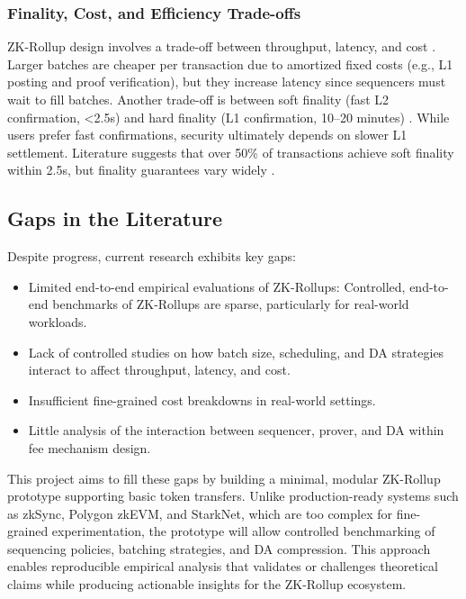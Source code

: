 \subsubsection{Finality, Cost, and Efficiency Trade-offs}
\vspace{12pt}
ZK-Rollup design involves a trade-off between throughput, latency, and cost \cite{motepalli2023sok}. Larger batches are cheaper per transaction due to amortized fixed costs (e.g., L1 posting and proof verification), but they increase latency since sequencers must wait to fill batches. Another trade-off is between soft finality (fast L2 confirmation, \textless 2.5s) and hard finality (L1 confirmation, 10–20 minutes) \cite{gogol2025scalingdefi}. While users prefer fast confirmations, security ultimately depends on slower L1 settlement. Literature suggests that over 50\% of transactions achieve soft finality within 2.5s, but finality guarantees vary widely \cite{gogol2025scalingdefi}.

\subsection{Gaps in the Literature}
\vspace{12pt}

Despite progress, current research exhibits key gaps:
\vspace{12pt}
\begin{itemize}
\item Limited end-to-end empirical evaluations of ZK-Rollups: Controlled, end-to-end benchmarks of ZK-Rollups are sparse, particularly for real-world workloads.
\item Lack of controlled studies on how batch size, scheduling, and DA strategies interact to affect throughput, latency, and cost.
\item Insufficient fine-grained cost breakdowns in real-world settings.
\item Little analysis of the interaction between sequencer, prover, and DA within fee mechanism design.
\end{itemize}

\vspace{12pt}

\vspace{12pt}

This project aims to fill these gaps by building a minimal, modular ZK-Rollup prototype supporting basic token transfers. Unlike production-ready systems such as zkSync, Polygon zkEVM, and StarkNet, which are too complex for fine-grained experimentation, the prototype will allow controlled benchmarking of sequencing policies, batching strategies, and DA compression. This approach enables reproducible empirical analysis that validates or challenges theoretical claims while producing actionable insights for the ZK-Rollup ecosystem.